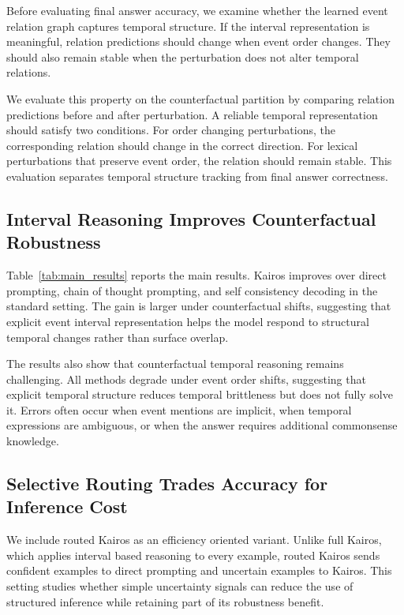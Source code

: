 \documentclass[11pt]{article}
\newcommand{\method}{Kairos}
\begin{document}
Before evaluating final answer accuracy, we examine whether the learned event relation graph captures temporal structure. If the interval representation is meaningful, relation predictions should change when event order changes. They should also remain stable when the perturbation does not alter temporal relations.

We evaluate this property on the counterfactual partition by comparing relation predictions before and after perturbation. A reliable temporal representation should satisfy two conditions. For order changing perturbations, the corresponding relation should change in the correct direction. For lexical perturbations that preserve event order, the relation should remain stable. This evaluation separates temporal structure tracking from final answer correctness.

\subsection{Interval Reasoning Improves Counterfactual Robustness}

Table~\ref{tab:main_results} reports the main results. \method{} improves over direct prompting, chain of thought prompting, and self consistency decoding in the standard setting. The gain is larger under counterfactual shifts, suggesting that explicit event interval representation helps the model respond to structural temporal changes rather than surface overlap.

The results also show that counterfactual temporal reasoning remains challenging. All methods degrade under event order shifts, suggesting that explicit temporal structure reduces temporal brittleness but does not fully solve it. Errors often occur when event mentions are implicit, when temporal expressions are ambiguous, or when the answer requires additional commonsense knowledge.

\subsection{Selective Routing Trades Accuracy for Inference Cost}

We include routed \method{} as an efficiency oriented variant. Unlike full \method, which applies interval based reasoning to every example, routed \method{} sends confident examples to direct prompting and uncertain examples to \method. This setting studies whether simple uncertainty signals can reduce the use of structured inference while retaining part of its robustness benefit.
\end{document}
